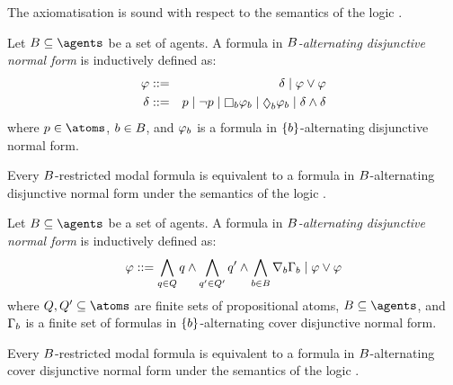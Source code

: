 \begin{lemma}
The axiomatisation \axiomRmlKD{} is sound with respect to the semantics of the logic \logicRmlKD{}.
\end{lemma}


\begin{definition}
Let $\agentsB \subseteq \agents$ be a set of agents.
A formula in {\em $B$-alternating disjunctive normal form} is inductively defined as:
\begin{eqnarray*}
\phi &::=& \delta \mid \phi \lor \phi\\
\delta &::=& \atomP \mid \neg \atomP \mid \necessaryB \phi_\agentB \mid \possibleB \phi_\agentB \mid \delta \land \delta
\end{eqnarray*}
where $\atomP \in \atoms$, $b \in B$, and $\varphi_b$ is a formula in $\{b\}$-alternating disjunctive normal form.
\end{definition}

\begin{lemma}
Every $B$-restricted modal formula is equivalent to a formula in $B$-alternating disjunctive normal form under the semantics of the logic \logicKD{}.
\end{lemma}


\begin{definition}
Let $\agentsB \subseteq \agents$ be a set of agents.
A formula in {\em $B$-alternating disjunctive normal form} is inductively defined as:
$$
\varphi ::= \bigwedge_{q \in Q} q \land \bigwedge_{q' \in Q'} q' \land \bigwedge_{b \in B} \nabla_{b} \Gamma_b \mid \varphi \lor \varphi
$$
where $\atomsQ, \atomsQ' \subseteq \atoms$ are finite sets of propositional atoms, $\agentsB \subseteq \agents$, and $\Gamma_b$ is a finite set of formulas in $\{b\}$-alternating cover disjunctive normal form.
\end{definition}

\begin{lemma}
Every $B$-restricted modal formula is equivalent to a formula in $B$-alternating cover disjunctive normal form under the semantics of the logic \logicKD{}.
\end{lemma}


